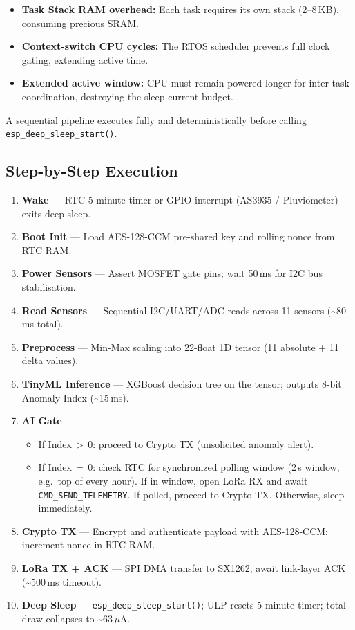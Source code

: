 \documentclass[12pt,a4paper]{article}
\begin{document}
\begin{itemize}
    \item \textbf{Task Stack RAM overhead:} Each task requires its own stack (2--8\,KB), consuming precious SRAM.
    \item \textbf{Context-switch CPU cycles:} The RTOS scheduler prevents full clock gating, extending active time.
    \item \textbf{Extended active window:} CPU must remain powered longer for inter-task coordination, destroying the sleep-current budget.
\end{itemize}

A sequential pipeline executes fully and deterministically before calling \texttt{esp\_deep\_sleep\_start()}.

\subsection{Step-by-Step Execution}

\begin{enumerate}[leftmargin=*, label=\textbf{Step \arabic*:}]
    \item \textbf{Wake} --- RTC 5-minute timer or GPIO interrupt (AS3935 / Pluviometer) exits deep sleep.
    \item \textbf{Boot Init} --- Load AES-128-CCM pre-shared key and rolling nonce from RTC RAM.
    \item \textbf{Power Sensors} --- Assert MOSFET gate pins; wait 50\,ms for I2C bus stabilisation.
    \item \textbf{Read Sensors} --- Sequential I2C/UART/ADC reads across 11 sensors (\textasciitilde80\,ms total).
    \item \textbf{Preprocess} --- Min-Max scaling into 22-float 1D tensor (11 absolute + 11 delta values).
    \item \textbf{TinyML Inference} --- XGBoost decision tree on the tensor; outputs 8-bit Anomaly Index (\textasciitilde15\,ms).
    \item \textbf{AI Gate} --- 
        \begin{itemize}
            \item If Index\,$>$\,0: proceed to Crypto TX (unsolicited anomaly alert).
            \item If Index\,$=$\,0: check RTC for synchronized polling window (2\,s window, e.g.\ top of every hour). If in window, open LoRa RX and await \texttt{CMD\_SEND\_TELEMETRY}. If polled, proceed to Crypto TX. Otherwise, sleep immediately.
        \end{itemize}
    \item \textbf{Crypto TX} --- Encrypt and authenticate payload with AES-128-CCM; increment nonce in RTC RAM.
    \item \textbf{LoRa TX + ACK} --- SPI DMA transfer to SX1262; await link-layer ACK (\textasciitilde500\,ms timeout).
    \item \textbf{Deep Sleep} --- \texttt{esp\_deep\_sleep\_start()}; ULP resets 5-minute timer; total draw collapses to \textasciitilde63\,$\mu$A.
\end{enumerate}
\end{document}
